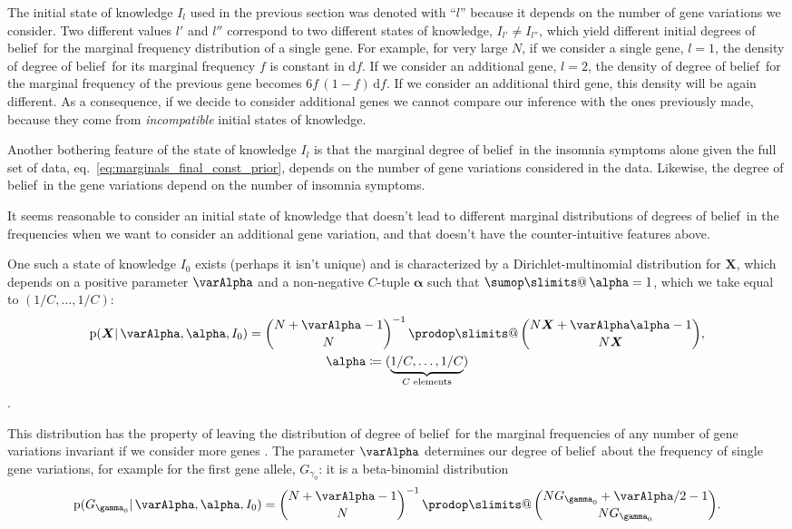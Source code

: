 \documentclass[\ifafour a4paper,12pt,\else a5paper,10pt,\fi%
onecolumn,oneside,article,%
british%
]{memoir}
\makeatletter
\theoremstyle{remark}
\theoremstyle{innote}
\def\sum{\DOTSI\sumop\slimits@}
\def\prod{\DOTSI\prodop\slimits@}
\newcommand*{\citep}{\parencites}
\newcommand*{\di}{\mathrm{d}}%
\newcommand*{\defd}{\coloneqq}
\newcommand*{\pf}{\mathrm{p}}%
\renewcommand*{\|}{\mathpunct{|}}
\newcommand*{\sect}{\S}%
\newcommand*{\sects}{\S\S}%
\newcommand*{\eqn}{eq.}%
\newcommand*{\tprod}{\mathop{\textstyle\prod}\nolimits}
\newcommand*{\tsum}{\mathop{\textstyle\sum}\nolimits}
\newcommand*{\dob}{degree of belief}
\newcommand*{\dobs}{degrees of belief}
\newcommand*{\yI}{I}
\newcommand*{\ysum}{\tsum}
\newcommand*{\yprod}{\tprod}
\newcommand*{\yg}{\gamma}
\newcommand*{\gn}{l}
\newcommand*{\yF}{\bm{X}}
\newcommand*{\yIc}{I_{\gn}}
\newcommand*{\yIo}{I_{0}}
\newcommand*{\yA}{\varAlpha}
\newcommand*{\ya}{\bm{\alpha}}
\makeatother
\begin{document}
The initial state of knowledge $\yIc$ used in the previous section was
denoted with \enquote{$\gn$} because it depends on the number of gene
variations we consider. Two different values $\gn'$ and $\gn''$ correspond
to two different states of knowledge, $\yI_{\gn'} \ne \yI_{\gn''}$, which
yield different initial \dobs\ for the marginal frequency distribution of a
single gene. For example, for very large $N$, if we consider a single gene,
$\gn=1$, the density of \dob\ for its marginal frequency $f$ is constant in
$\di f$. If we consider an additional gene, $\gn=2$, the density of \dob\
for the marginal frequency of the previous gene becomes
$6 f\, (1-f)\,\di f$. If we consider an additional third gene, this density
will be again different. As a consequence, if we decide to consider
additional genes we cannot compare our inference with the ones previously
made, because they come from \emph{incompatible} initial states of
knowledge.

Another bothering feature of the state of knowledge $\yIc$ is that the
marginal \dob\ in the insomnia symptoms alone given the full set of
data, \eqn~\eqref{eq:marginals_final_const_prior}, depends on the number of
gene variations considered in the data. Likewise, the \dob\ in the
gene variations depend on the number of insomnia symptoms.

It seems reasonable to consider an initial state of knowledge that doesn't
lead to different marginal distributions of \dobs\ in the frequencies when
we want to consider an additional gene variation, and that doesn't have
the counter-intuitive features above.

One such a state of knowledge $\yIo$ exists (perhaps it isn't unique) and
is characterized by a Dirichlet-multinomial distribution for $\yF$, which
depends on a positive parameter $\yA$ and a non-negative $C$-tuple $\ya$
such that $\ysum\ya=1$, which we take equal to $(1/C,\dotsc,1/C)$:
\begin{multline}
  \label{eq:dirichlet_prior}
  \pf(\yF \| \yA, \ya,\yIo) =
  \binom{N+\yA-1}{N}^{-1} \yprod\binom{N\yF+\yA\ya-1}{N\yF},\\
  \ya \defd (\underbrace{1/C,\dotsc,1/C}_{\text{$C$ elements}})
\end{multline}
\citep[\sect~13.1]{johnsonetal1969_r1996}[\sect~3]{minka2000_r2012}[and
especially][\sects~3--4]{basuetal1982}.

This distribution has the property of leaving the distribution of \dob\ for
the marginal frequencies of any number of gene variations invariant if we
consider more genes \citep[\sects~3--4]{basuetal1982}. The parameter $\yA$
determines our \dob\ about the frequency of single gene variations, for
example for the first gene allele, $G_{\yg_0}$: it is a
beta-binomial distribution
\begin{equation}
  \label{eq:dirichlet_prior_marginal_beta-binomial}
  \pf(G_{\yg_0} \| \yA, \ya,\yIo) =
  \binom{N+\yA-1}{N}^{-1} \yprod\binom{N G_{\yg_0}+\yA/2-1}{N G_{\yg_0}}.
\end{equation}
\end{document}
